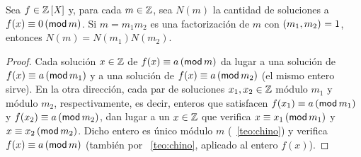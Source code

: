 \begin{coroChino}\label{coro:chino:polinomial}
	Sea $f\in\polinomios\Enteros$ y, para cada $m\in\Enteros$,
	sea $N(m)$ la cantidad de soluciones a $f(x)\equiv 0\tmodulo[m]$.
	Si $m=m_1m_2$ es una factorizaci\'on de $m$ con $\mcd{m_1,m_2}=1$,
	entonces $N(m)=N(m_1)N(m_2)$.
\end{coroChino}

\begin{proof}
	Cada soluci\'on $x\in\Enteros$ de $f(x)\equiv a\tmodulo[m]$
	da lugar a una soluci\'on de $f(x)\equiv a\tmodulo[m_1]$ y a
	una soluci\'on de $f(x)\equiv a\tmodulo[m_2]$ (el mismo entero sirve).
	En la otra direcci\'on,
	cada par de soluciones $x_1,x_2\in\Enteros$ m\'odulo $m_1$ y
	m\'odulo $m_2$, respectivamente, es decir, enteros que satisfacen
	$f(x_1)\equiv a\tmodulo[m_1]$ y $f(x_2)\equiv a\tmodulo[m_2]$,
	dan lugar a un $x\in\Enteros$ que verifica
	$x\equiv x_1\tmodulo[m_1]$ y $x\equiv x_2\tmodulo[m_2]$.
	Dicho entero es \'unico m\'odulo $m$ (\teoname~\ref{teo:chino})
	y verifica $f(x)\equiv a\tmodulo[m]$ (tambi\'en por
	\teoname~\ref{teo:chino}, aplicado al entero $f(x)$).
\end{proof}

